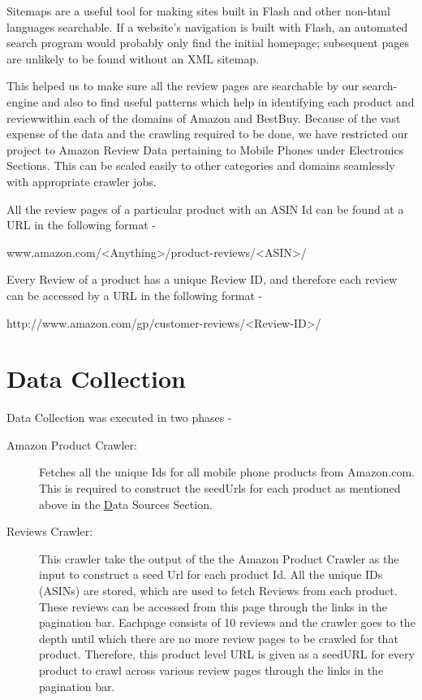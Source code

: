 \documentclass{article}
\begin{document}
Sitemaps are a useful tool for making sites built in Flash and other non-html languages searchable. If a website's navigation is built with Flash, an automated search program would probably only find the initial homepage; subsequent pages are unlikely to be found without an XML sitemap.

This helped us to make sure all the review pages are searchable by our search-engine and also to find useful patterns which help in identifying each product and reviewwithin each of the domains of Amazon and BestBuy. Because of the vast expense of the data and the crawling required to be done, we have restricted our project to Amazon Review Data pertaining to Mobile Phones under Electronics Sections. This can be scaled easily to other categories and domains seamlessly with appropriate crawler jobs. 

All the review pages of a particular product with an ASIN Id can be found at a URL in the following format -

\begin{center}
\label{sec:urlPattern}
	www.amazon.com/<Anything>/product-reviews/<ASIN>/
\end{center}

Every Review of a product has a unique Review ID, and therefore each review can be accessed by a URL in the following format - 
\begin{center}
	http://www.amazon.com/gp/customer-reviews/<Review-ID>/
\end{center}

\section{Data Collection}

Data Collection was executed in two phases - 

\begin{description}
	\item[Amazon Product Crawler: ] Fetches all the unique Ids for all mobile phone products from Amazon.com. This is required to construct the seedUrls for each product as mentioned above in the \hyperref[sec:dataSources] Data Sources Section.
	\item[Reviews Crawler: ] This crawler take the output of the the Amazon Product Crawler as the input to construct a seed Url for each product Id. All the unique IDs (ASINs) are stored, which are used to fetch Reviews from each product. These reviews can be accessed from this page through the links in the pagination bar. Eachpage consists of 10 reviews and the crawler goes to the depth until which there are no more review pages to be crawled for that product. Therefore, this product level URL is given as a seedURL for every product to crawl across various review pages through the links in the pagination bar.
\end{description}
\end{document}
